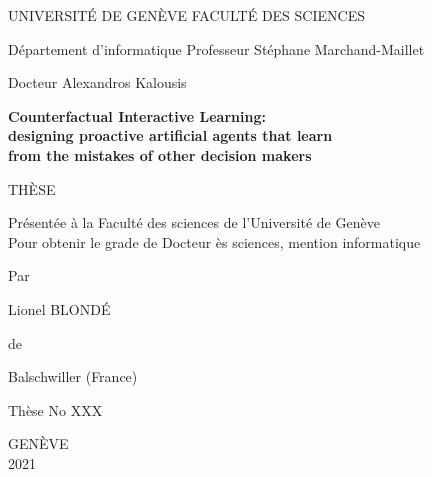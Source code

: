 \documentclass[11pt,a4paper]{book}
\begin{document}
\begin{titlepage}

\thispagestyle{empty}

\large

UNIVERSITÉ DE GENÈVE \hfill FACULTÉ DES SCIENCES

\vspace{0.7em}

Département d'informatique \hfill Professeur Stéphane Marchand-Maillet

\hfill Docteur Alexandros Kalousis

\vspace{-0.5em}

\hrulefill

\vspace{5em}

\begin{center}

\begin{LARGE}
\textbf{Counterfactual Interactive Learning: \\
designing proactive artificial agents that learn \\
from the mistakes of other decision makers}
\end{LARGE}

\vspace{3.8em}

THÈSE

\vspace{1em}

Présentée à la Faculté des sciences de l'Université de Genève \\
Pour obtenir le grade de Docteur ès sciences, mention informatique

\vspace{4em}

Par

\vspace{0.7em}

Lionel BLOND\'E

\vspace{0.8em}

de

\vspace{0.7em}

Balschwiller (France)

\vspace{5.5em}

Thèse No XXX  %

\vspace{4.5em}
GENÈVE \\
2021

\end{center}

\end{titlepage}
\end{document}
